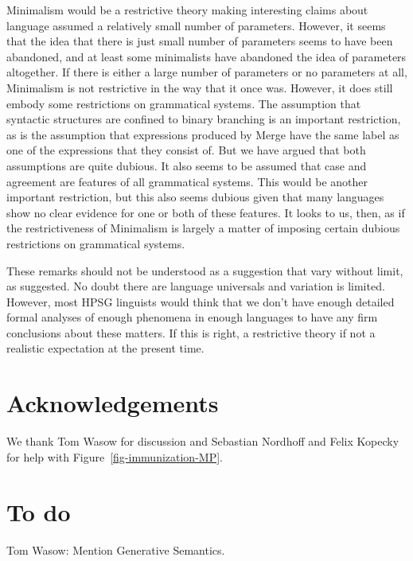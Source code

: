 \documentclass[output=paper]{langsci/langscibook}
\begin{document}
Minimalism would be a restrictive theory making interesting claims about language assumed a
relatively small number of parameters. However, it seems that the idea that there is just small
number of parameters seems to have been abandoned, and at least some minimalists have abandoned the
idea of parameters altogether. If there is either a large number of parameters or no parameters at
all, Minimalism is not restrictive in the way that it once was. However, it does still embody some
restrictions on grammatical systems. The assumption that syntactic structures are confined to binary
branching is an important restriction, as is the assumption that expressions produced by Merge have
the same label as one of the expressions that they consist of. But we have argued that both
assumptions are quite dubious. It also seems to be assumed that case and agreement are features of
all grammatical systems. This would be another important restriction, but this also seems dubious
given that many languages show no clear evidence for one or both of these features. It looks to us,
then, as if the restrictiveness of Minimalism is largely a matter of imposing certain dubious
restrictions on grammatical systems.

These remarks should not be understood as a suggestion that vary without limit, as
\citet[]{Joos58a-u} suggested. No doubt there are language universals and variation
is limited. However, most HPSG linguists would think that we don’t have enough detailed formal
analyses of enough phenomena in enough languages to have any firm conclusions about these matters.
If this is right, a restrictive theory if not a realistic expectation at the present time.%





\section*{Acknowledgements}

We thank Tom Wasow for discussion and Sebastian Nordhoff and Felix Kopecky for help with Figure~\ref{fig-immunization-MP}.

\section{To do}


Tom Wasow: Mention Generative Semantics.

{\sloppy 
\printbibliography[heading=subbibliography,notkeyword=this] 
}
\end{document}
